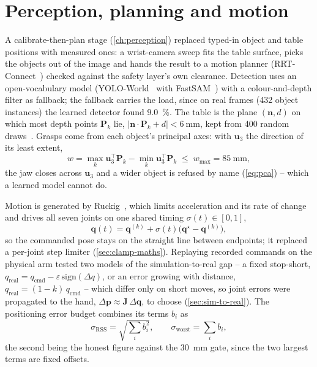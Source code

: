 \section{Perception, planning and motion}

A calibrate-then-plan stage (\cref{ch:perception}) replaced typed-in object
and table positions with measured ones: a wrist-camera sweep fits the table
surface, picks the objects out of the image and hands the result to a
motion planner (RRT-Connect~\cite{kuffner2000rrtconnect}) checked against
the safety layer's own clearance. Detection uses an open-vocabulary model
(YOLO-World~\cite{cheng2024yoloworld} with FastSAM~\cite{zhao2023fastsam})
with a colour-and-depth filter as fallback; the fallback carries the load,
since on real frames (432 object instances) the learned detector found
\SI{9.0}{\percent}. The table is the plane $(\mathbf{n}, d)$ on which most
depth points $\mathbf{P}_k$ lie, $|\mathbf{n}\cdot\mathbf{P}_k + d| <
\SI{6}{\milli\metre}$, kept from 400 random draws~\cite{fischler1981ransac}.
Grasps come from each object's principal axes: with $\mathbf{u}_3$ the
direction of its least extent,
\begin{equation}
  w = \max_k \mathbf{u}_3^{\!\top}\mathbf{P}_k - \min_k \mathbf{u}_3^{\!\top}\mathbf{P}_k \;\le\; w_{\max} = \SI{85}{\milli\metre},
  \label{eq:grasp-main}
\end{equation}
the jaw closes across $\mathbf{u}_3$ and a wider object is refused by name
(\cref{eq:pca}) -- which a learned model cannot do.

Motion is generated by Ruckig~\cite{berscheid2021ruckig}, which limits
acceleration and its rate of change and drives all seven joints on one
shared timing $\sigma(t)\in[0,1]$,
\begin{equation}
  \mathbf{q}(t) = \mathbf{q}^{(k)} + \sigma(t)\bigl(\mathbf{q}^\star - \mathbf{q}^{(k)}\bigr),
  \label{eq:phase-main}
\end{equation}
so the commanded pose stays on the straight line between endpoints; it
replaced a per-joint step limiter (\cref{sec:clamp-maths}). Replaying
recorded commands on the physical arm tested two models of the
simulation-to-real gap -- a fixed stop-short, $q_{\text{real}} =
q_{\text{cmd}} - \varepsilon\,\mathrm{sign}(\Delta q)$, or an error growing
with distance, $q_{\text{real}} = (1-k)\,q_{\text{cmd}}$ -- which differ only
on short moves, so joint errors were propagated to the hand,
$\Delta\mathbf{p} \approx \mathbf{J}\,\Delta\mathbf{q}$, to choose
(\cref{sec:sim-to-real}). The positioning error budget combines its terms
$b_i$ as
\begin{equation}
  \sigma_{\text{RSS}} = \sqrt{\textstyle\sum_i b_i^2}, \qquad
  \sigma_{\text{worst}} = \textstyle\sum_i b_i,
  \label{eq:budget-main}
\end{equation}
the second being the honest figure against the \SI{30}{\milli\metre} gate,
since the two largest terms are fixed offsets.

